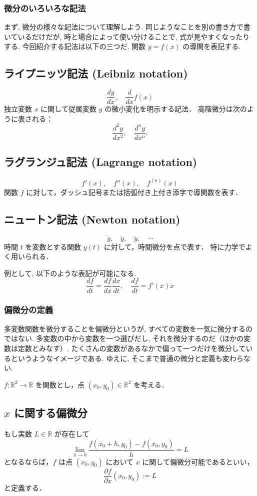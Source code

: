 \documentclass{ltjsarticle}
\begin{document}
\subsubsection{微分のいろいろな記法}
まず, 微分の様々な記法について理解しよう. 
同じようなことを別の書き方で書いているだけだが, 時と場合によって使い分けることで, 
式が見やすくなったりする. 今回紹介する記法は以下の三つだ. 
関数 $y = f(x)$ の導関を表記する. 

\subsection*{ライプニッツ記法 (Leibniz notation)}
\[
\frac{dy}{dx}, \quad \frac{d}{dx} f(x)
\]
独立変数 $x$ に関して従属変数 $y$ の微小変化を明示する記法．
高階微分は次のように表される：
\[
\frac{d^2 y}{dx^2}, \quad \frac{d^n y}{dx^n}.
\]

\subsection*{ラグランジュ記法 (Lagrange notation)}
\[
f'(x), \quad f''(x), \quad f^{(n)}(x)
\]
関数 $f$ に対して，ダッシュ記号または括弧付き上付き添字で導関数を表す．

\subsection*{ニュートン記法 (Newton notation)}
\[
\dot{y}, \quad \ddot{y}, \quad \dddot{y}, \quad \cdots
\]
時間 $t$ を変数とする関数 $y(t)$ に対して，時間微分を点で表す．
特に力学でよく用いられる．

例として, 以下のような表記が可能になる. 
\[
\frac{df}{dt} = \frac{df}{dx}\frac{dx}{dt}, \quad \frac{df}{dt} = f'(x)\dot{x}
\]

\subsubsection{偏微分の定義}
多変数関数を微分することを偏微分というが, すべての変数を一気に微分するのではない. 
多変数の中から変数を一つ選びだし, それを微分するのだ（ほかの変数は定数とみなす）. 
たくさんの変数があるなかで偏って一つだけを微分しているというようなイメージである. 
ゆえに, そこまで普通の微分と定義も変わらない. 

$f : \mathbb{R}^2 \to \mathbb{R}$ を関数とし，点 $(x_0,y_0) \in \mathbb{R}^2$ を考える．

\subsection*{$x$ に関する偏微分}
もし実数 $L \in \mathbb{R}$ が存在して
\[
\lim_{h \to 0} 
\frac{f(x_0 + h, y_0) - f(x_0,y_0)}{h} = L
\]
となるならば，$f$ は点 $(x_0,y_0)$ において $x$ に関して偏微分可能であるといい，
\[
\frac{\partial f}{\partial x}(x_0,y_0) := L
\]
と定義する．
\end{document}
